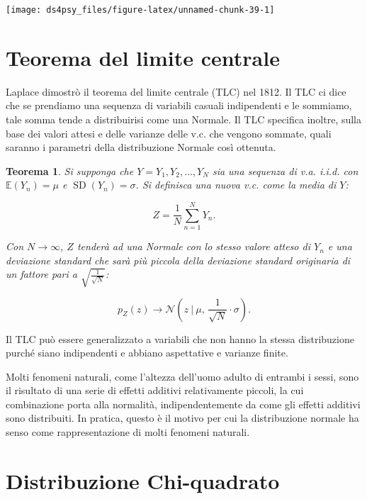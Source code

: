 \documentclass[
  11pt,
]{krantz}
\newcommand{\E}{\mathbb{E}} %
\DeclareMathOperator{\SD}{SD} %
\newtheorem{theorem}{Teorema}[chapter]
\theoremstyle{definition}
\theoremstyle{definition}
\theoremstyle{definition}
\theoremstyle{definition}
\theoremstyle{remark}
\begin{document}
\begin{center}\texttt{[image: ds4psy\_files/figure-latex/unnamed-chunk-39-1]} \end{center}

\hypertarget{teorema-del-limite-centrale}{%
\section{Teorema del limite centrale}\label{teorema-del-limite-centrale}}

Laplace dimostrò il teorema del limite centrale (TLC) nel 1812. Il TLC ci dice che se prendiamo una sequenza di variabili casuali indipendenti e le sommiamo, tale somma tende a distribuirisi come una Normale. Il TLC specifica inoltre, sulla base dei valori attesi e delle varianze delle v.c. che vengono sommate, quali saranno i parametri della distribuzione Normale così ottenuta.

\begin{theorem}
Si supponga che \(Y = Y_1, Y_2, \ldots, Y_N\) sia una sequenza di v.a. i.i.d. con \(\E(Y_n) = \mu\) e \(\SD(Y_n) = \sigma\). Si definisca una nuova v.c. come la media di \(Y\):

\[
Z = \frac{1}{N} \sum_{n=1}^N Y_n.
\]

Con \(N \rightarrow \infty\), \(Z\) tenderà ad una Normale con lo stesso valore atteso di \(Y_n\) e una deviazione standard che sarà più piccola della deviazione standard originaria di un fattore pari a \(\sqrt{\frac{1}{\sqrt{N}}}\):

\begin{equation}
p_Z(z) \rightarrow \mathcal{N}\left(z \ \Bigg| \ \mu, \, \frac{1}{\sqrt{N}} \cdot \sigma \right).
\end{equation}
\end{theorem}

Il TLC può essere generalizzato a variabili che non hanno la stessa distribuzione purché siano indipendenti e abbiano aspettative e varianze finite.

Molti fenomeni naturali, come l'altezza dell'uomo adulto di entrambi i sessi, sono il risultato di una serie di effetti additivi relativamente piccoli, la cui combinazione porta alla normalità, indipendentemente da come gli effetti additivi sono distribuiti. In pratica, questo è il motivo per cui la distribuzione normale ha senso come rappresentazione di molti fenomeni naturali.

\hypertarget{distribuzione-chi-quadrato}{%
\section{Distribuzione Chi-quadrato}\label{distribuzione-chi-quadrato}}
\end{document}
